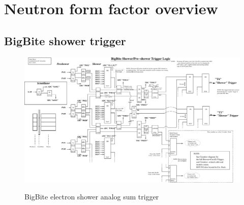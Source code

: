 \documentclass{article}
\begin{document}
\section{Neutron form factor overview}
\subsection {BigBite shower trigger}

\begin{figure}
\includegraphics[scale=0.9,angle=270]{figs/Sh-PS_logic_v2A.pdf}\\
\caption {BigBite electron shower analog sum trigger \label{BBEtrig}}
\end{figure}
\end{document}
